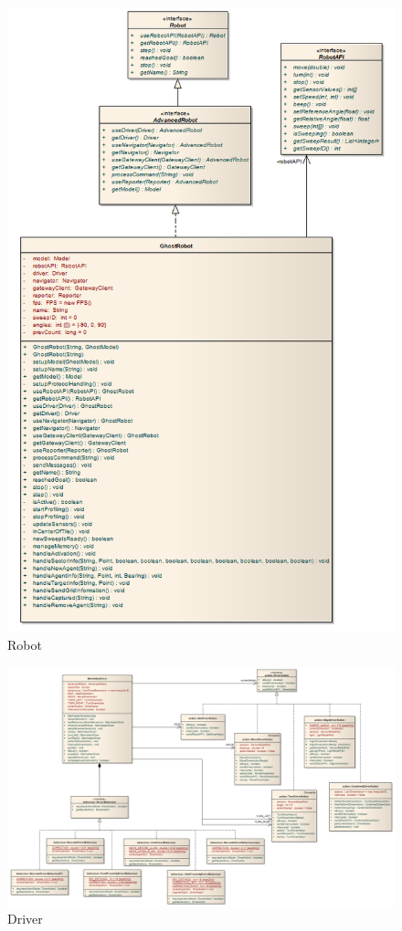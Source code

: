 \documentclass[12pt,a4paper]{report}
\begin{document}
\begin{figure}[htbp]
  \centering
  \includegraphics[width=150mm]{resources/model-robot2.png}
  \caption{Robot}
  \label{uml:robot}
\end{figure}

\begin{figure}[htbp]
  \centering
  \includegraphics[width=200mm, angle=90]{resources/model-driver2.png}
  \caption{Driver}
  \label{uml:driver}
\end{figure}
\end{document}
